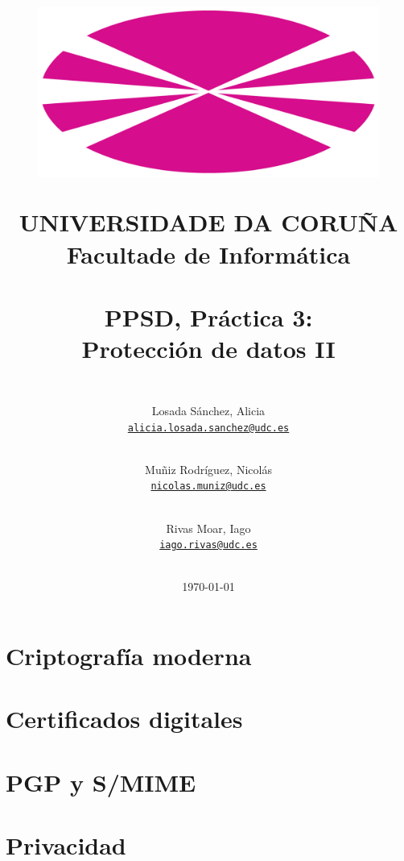 \documentclass[12pt,a4paper]{article}
\title{
    \begin{figure}[htbp!]
        \begin{center}
        \includegraphics[scale=0.35]{UDC.png}       %
        \end{center}
        \label{fig:udc}
    \end{figure}

    \textsf{UNIVERSIDADE DA CORUÑA} \\
    \textsf{\Large Facultade de Informática} \\
    \hfill \\
    \textbf{PPSD, Práctica 3: \\ Protección de datos II}
}
\author{
    \\
    Losada Sánchez, Alicia \\
    \texttt{\href{mailto:alicia.losada.sanchez@udc.es}{alicia.losada.sanchez@udc.es}}
    \and \\
    Muñiz Rodríguez, Nicolás \\
    \texttt{\href{mailto:nicolas.muniz@udc.es}{nicolas.muniz@udc.es}}
    \and \\
    Rivas Moar, Iago \\
    \texttt{\href{mailto:iago.rivas@udc.es}{iago.rivas@udc.es}}
    \\ \\
}
\date{\today}
\begin{document}
\maketitle

\thispagestyle{empty}

\newpage
{}

\tableofcontents
\thispagestyle{fancy}

\newpage
\fancyfoot[C]{\thepage}

\section{Criptografía moderna}




\section{Certificados digitales}



\section{PGP y S/MIME}







\section{Privacidad}






\end{document}
